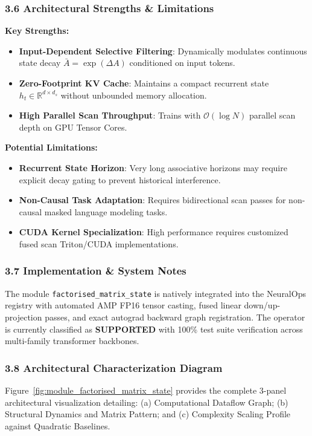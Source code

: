 \subsubsection*{3.6 Architectural Strengths \& Limitations}
\textbf{Key Strengths:}
\begin{itemize}
    \item \textbf{Input-Dependent Selective Filtering}: Dynamically modulates continuous state decay $\bar{A} = \exp(\Delta A)$ conditioned on input tokens.
    \item \textbf{Zero-Footprint KV Cache}: Maintains a compact recurrent state $h_t \in \mathbb{R}^{d \times d_s}$ without unbounded memory allocation.
    \item \textbf{High Parallel Scan Throughput}: Trains with $\mathcal{O}(\log N)$ parallel scan depth on GPU Tensor Cores.
\end{itemize}

\textbf{Potential Limitations:}
\begin{itemize}
    \item \textbf{Recurrent State Horizon}: Very long associative horizons may require explicit decay gating to prevent historical interference.
    \item \textbf{Non-Causal Task Adaptation}: Requires bidirectional scan passes for non-causal masked language modeling tasks.
    \item \textbf{CUDA Kernel Specialization}: High performance requires customized fused scan Triton/CUDA implementations.
\end{itemize}

\subsubsection*{3.7 Implementation \& System Notes}
The module \texttt{factorised\_matrix\_state} is natively integrated into the NeuralOps registry with automated AMP FP16 tensor casting, fused linear down/up-projection passes, and exact autograd backward graph registration. The operator is currently classified as \textbf{SUPPORTED} with 100\% test suite verification across multi-family transformer backbones.

\subsubsection*{3.8 Architectural Characterization Diagram}
Figure~\ref{fig:module_factorised_matrix_state} provides the complete 3-panel architectural visualization detailing: (a) Computational Dataflow Graph; (b) Structural Dynamics and Matrix Pattern; and (c) Complexity Scaling Profile against Quadratic Baselines.

